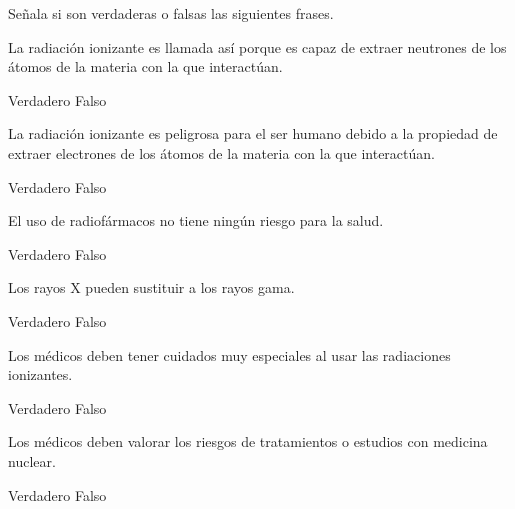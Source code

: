 Señala si son verdaderas o falsas las siguientes frases.
\begin{parts}
    La radiación ionizante es llamada así porque es capaz de extraer neutrones de los átomos de la materia con la que interactúan.
    {\footnotesize
    \begin{choices}
        \choice Verdadero
        \choice Falso
    \end{choices}
    }

    La radiación ionizante es peligrosa para el ser humano debido a la propiedad de extraer electrones de los átomos de la materia con la que interactúan.
    {\footnotesize
    \begin{choices}
        \choice Verdadero
        \choice Falso
    \end{choices}
    }

    El uso de radiofármacos no tiene ningún riesgo para la salud.
        {\footnotesize
            \begin{choices}
                \choice Verdadero
                \choice Falso
            \end{choices}
        }

    \newpage
    Los rayos X pueden sustituir a los rayos gama.
        {\footnotesize
            \begin{choices}
                \choice Verdadero
                \choice Falso
            \end{choices}
        }

    Los médicos deben tener cuidados muy especiales al usar las radiaciones ionizantes.
        {\footnotesize
            \begin{choices}
                \choice Verdadero
                \choice Falso
            \end{choices}
        }

    Los médicos deben valorar los riesgos de tratamientos o estudios con medicina nuclear.
        {\footnotesize
            \begin{choices}
                \choice Verdadero
                \choice Falso
            \end{choices}
        }
\end{parts}